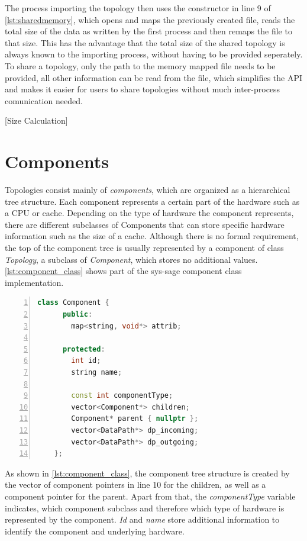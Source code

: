 The process importing the topology then uses the constructor in line 9 of \autoref{lst:sharedmemory}, which opens and maps the previously created file,
reads the total size of the data as written by the first process and then remaps the file to that size.
This has the advantage that the total size of the shared topology is always known to the importing process, without having to be provided seperately.
To share a topology, only the path to the memory mapped file needs to be provided, all other information can be read from the file, which simplifies the API and makes it easier
for users to share topologies without much inter-process comunication needed.


[Size Calculation]%

\section{Components}
Topologies consist mainly of \emph{components}, which are organized as a hierarchical tree structure.
Each component represents a certain part of the hardware such as a CPU or cache.
Depending on the type of hardware the component represents, there are different subclasses of Components that can store specific hardware information such as the size of a cache.
Although there is no formal requirement, the top of the component tree is usually represented by a component of class \emph{Topology}, a subclass of \emph{Component},
which stores no additional values.
\autoref{lst:component_class} shows part of the sys-sage component class implementation.

\begin{lstlisting}[language=c++, numbers=left, caption=Component Class, captionpos=b, label={lst:component_class}]
    class Component {
      public:
        map<string, void*> attrib;

      protected:
        int id;
        string name;

        const int componentType;
        vector<Component*> children;
        Component* parent { nullptr };
        vector<DataPath*> dp_incoming;
        vector<DataPath*> dp_outgoing;
    };
\end{lstlisting}

As shown in \autoref{lst:component_class}, the component tree structure is created by the vector of component pointers in line 10 for the children, as well as a component pointer
for the parent.
Apart from that, the \emph{componentType} variable indicates, which component subclass and therefore which type of hardware is represented by the component.
\emph{Id} and \emph{name} store additional information to identify the component and underlying hardware.

